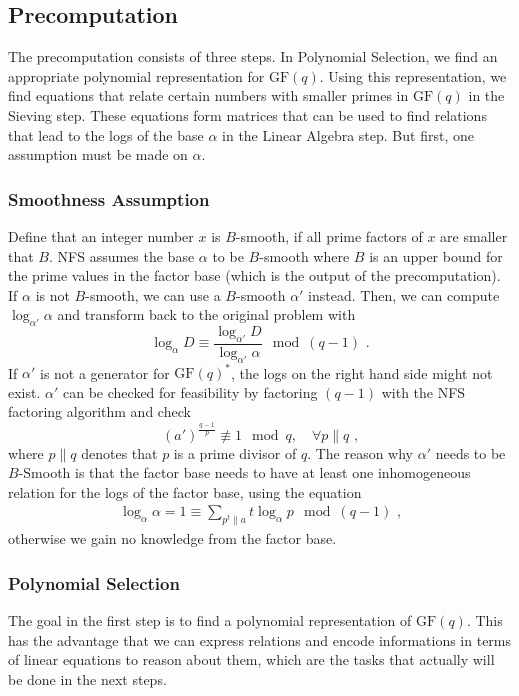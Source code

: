 \documentclass[paper=a4, fontsize=11pt]{scrartcl} %
\numberwithin{equation}{section} %
\numberwithin{figure}{section} %
\numberwithin{table}{section} %
\begin{document}
\subsection{Precomputation}
\label{subsec:precomputation}
The precomputation consists of three steps. In Polynomial Selection, we find an appropriate polynomial representation for $\mathrm{GF}(q)$. Using this representation, we find equations that relate certain numbers with smaller primes in $\mathrm{GF}(q)$ in the Sieving step. These equations form matrices that can be used to find relations that lead to the logs of the base $\alpha$ in the Linear Algebra step. But first, one assumption must be made on $\alpha$.

\subsubsection{Smoothness Assumption}
Define that an integer number $x$ is $B$-smooth, if all prime factors of $x$ are smaller that $B$. NFS assumes the base $\alpha$ to be $B$-smooth where $B$ is an upper bound for the prime values in the factor base (which is the output of the precomputation). If $\alpha$ is not $B$-smooth, we can use a $B$-smooth $\alpha'$ instead. Then, we can compute $\log_{\alpha'}\alpha$ and transform back to the original problem with
\begin{equation}
\log_\alpha D\equiv\frac{\log_{\alpha'}D}{\log_{\alpha'}\alpha}\mod (q-1)
\text{ .}
\end{equation}
If $\alpha'$ is not a generator for $\mathrm{GF}(q)^*$, the logs on the right hand side might not exist. $\alpha'$ can be checked for feasibility by factoring $(q-1)$ with the NFS factoring algorithm and check
\begin{equation}
(a')^{\frac{q-1}{p}} \not\equiv 1 \mod q,\quad\forall p\parallel q
\text{ ,}
\end{equation}
where $p\parallel q$ denotes that $p$ is a prime divisor of $q$. The reason why $\alpha'$ needs to be $B$-Smooth is that the factor base needs to have at least one inhomogeneous relation for the logs of the factor base, using the equation
\begin{eqnarray}
\label{eqn:assumption}
\log_\alpha\alpha = 1 \equiv \sum_{p^t\parallel a}t\log_\alpha p \mod (q-1)
\text{ ,}
\end{eqnarray}
otherwise we gain no knowledge from the factor base.

\subsubsection{Polynomial Selection}
The goal in the first step is to find a polynomial representation of $\mathrm{GF}(q)$. This has the advantage that we can express relations and encode informations in terms of linear equations to reason about them, which are the tasks that actually will be done in the next steps.
\end{document}
